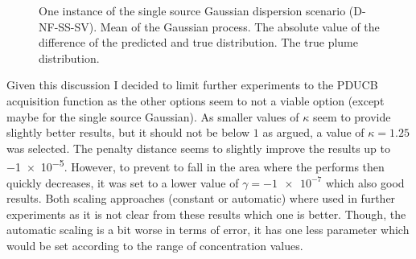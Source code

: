\begin{figure}
    \centering
    \caption[Example visualization of the plume prediction]{One instance of the 
        single source Gaussian dispersion scenario (D-NF-SS-SV).  
         Mean of the Gaussian process.  
         The absolute value of the difference of the 
        predicted and true distribution.   The true plume 
        distribution.}\label{fig:plume}
\end{figure}

Given this discussion I decided to limit further experiments to the PDUCB 
acquisition function as the other options seem to not a viable option (except 
maybe for the single source Gaussian). As smaller values of $\kappa$ seem to 
provide slightly better results, but it should not be below $1$ as argued, 
a value of $\kappa = 1.25$ was selected. The penalty distance seems to slightly 
improve the results up to \num{-1e-5}. However, to prevent to fall in the area 
where the performs then quickly decreases, it was set to a lower value of 
$\gamma = \num{-1e-7}$ which also good results. Both scaling approaches 
(constant or automatic) where used in further experiments as it is not clear 
from these results which one is better. Though, the automatic scaling is a bit 
worse in terms of error, it has one less parameter which would be set according 
to the range of concentration values.


